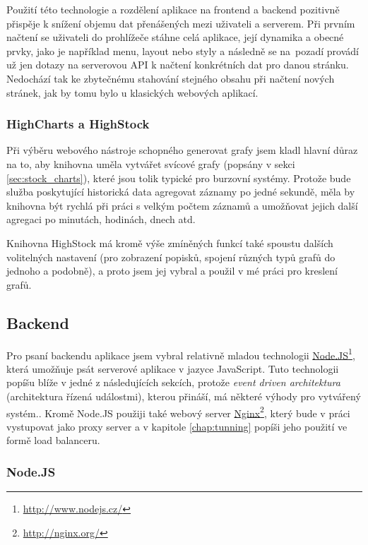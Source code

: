 \documentclass[thesis=M,czech]{FITthesis}[2012/06/26]
\newcommand\fnurl[2]{\href{#2}{#1}\footnote{\url{#2}}}
\begin{document}
	Použití této technologie a rozdělení aplikace na frontend a backend pozitivně přispěje k snížení objemu dat přenášených mezi uživateli a serverem. Při prvním načtení se uživateli do prohlížeče stáhne celá aplikace, její dynamika a obecné prvky, jako je například menu, layout nebo styly a následně se na~pozadí provádí už jen dotazy na serverovou API k načtení konkrétních dat pro danou stránku. Nedochází tak ke zbytečnému stahování stejného obsahu při načtení nových stránek, jak by tomu bylo u klasických webových aplikací.
		
\subsubsection{HighCharts a HighStock}

	Při výběru webového nástroje schopného generovat grafy jsem kladl hlavní důraz na to, aby knihovna uměla vytvářet svícové grafy (popsány v sekci \ref{sec:stock_charts}), které jsou tolik typické pro burzovní systémy. Protože bude služba poskytující historická data agregovat záznamy po jedné sekundě, měla by knihovna být rychlá při práci s velkým počtem záznamů a umožňovat jejich další agregaci po minutách, hodinách, dnech atd.
		
	Knihovna HighStock má kromě výše zmíněných funkcí také spoustu dalších volitelných nastavení (pro zobrazení popisků, spojení různých typů grafů do jednoho a podobně), a proto jsem jej vybral a použil v mé práci pro kreslení grafů.
	
\subsection{Backend}
	
	Pro psaní backendu aplikace jsem vybral relativně mladou technologii \fnurl{Node.JS}{http://www.nodejs.cz/}, která umožňuje psát serverové aplikace v jazyce JavaScript. Tuto technologii popíšu blíže v jedné z následujících sekcích, protože \textit{event driven architektura} (architektura řízená událostmi), kterou přináší, má některé výhody pro vytvářený systém.. Kromě Node.JS použiji také webový server \fnurl{Nginx}{http://nginx.org/}, který bude v práci vystupovat jako proxy server a v kapitole \ref{chap:tunning} popíši jeho použití ve formě load balanceru.
	
\subsubsection{Node.JS}
\label{sec:nodejs}
\end{document}
